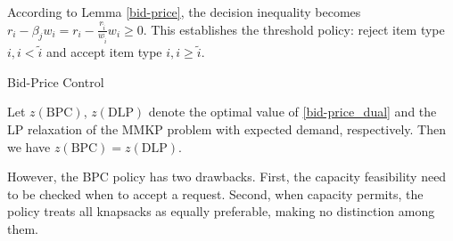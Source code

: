 According to Lemma \ref{bid-price}, the decision inequality becomes $r_i -\beta_{j} w_i = r_{i} - \frac{r_{\tilde{i}}}{w_{\tilde{i}}} w_{i} \geq 0$. This establishes the threshold policy: reject item type $i, i < \tilde{i}$ and accept item type $i, i \geq \tilde{i}$.


\begin{algorithm}[H]
    \caption{Bid-Price Control}\label{algo_bid}
\end{algorithm}





Let $z(\text{BPC})$, $z(\text{DLP})$ denote the optimal value of \eqref{bid-price_dual} and the LP relaxation of the \textup{MMKP} problem with expected demand, respectively. Then we have $z(\text{BPC}) = z(\text{DLP})$.

However, the BPC policy has two drawbacks. First, the capacity feasibility need to be checked when to accept a request. Second, when capacity permits, the policy treats all knapsacks as equally preferable, making no distinction among them.

